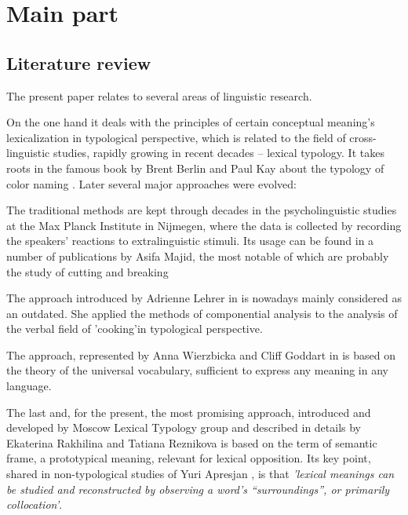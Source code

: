 \section{Main part}
\subsection{Literature review}
The present paper relates to several areas of linguistic research. 

\par On the one hand it deals with the principles of certain conceptual meaning's lexicalization in typological perspective, which is related to the field of cross-linguistic studies, rapidly growing in recent decades -- lexical typology. It takes roots in the famous book by Brent Berlin and Paul Kay about the typology of color naming \citep{berlin1969basic}. Later several major approaches were evolved:  \begin{enumerate*}[itemjoin={\hskip3mm},after=\hskip3mm,before=\hskip3mm]
    \item The traditional methods are kept through decades in the psycholinguistic studies at the Max Planck Institute in Nijmegen, where the data is collected by recording the speakers’ reactions to extralinguistic stimuli. Its usage can be found in a number of publications by Asifa Majid, the most notable of which are probably the study of cutting and breaking \citep{majid2008cross, majid2007semantic}
    \item The approach introduced by Adrienne Lehrer in  \citep{lehrer1969semantic} is nowadays mainly considered as an outdated. She applied the methods of componential analysis to the analysis of the verbal field of 'cooking'in typological perspective.
    \item The approach, represented by Anna Wierzbicka and Cliff Goddart in \citep{goddard1994semantic} is based on the theory of the universal vocabulary, sufficient to express any meaning in any language.
    \item The last and, for the present, the most promising approach, introduced and developed by Moscow Lexical Typology group and described in details by Ekaterina Rakhilina and Tatiana Reznikova  \citep{rakhilina2016frame} is based on the term of semantic frame, a prototypical meaning, relevant for lexical opposition. Its key point, shared in non-typological studies of Yuri Apresjan \citep{апресян1995избранные}, is that \textit{'lexical meanings can be studied and reconstructed by observing a word’s “surroundings”, or primarily collocation'}.
\end{enumerate*}



